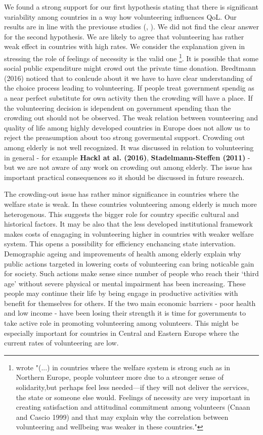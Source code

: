 \documentclass[10pt, letterpaper]{article}
\begin{document}
\begin{spacing}{1.4}
We found a strong support for our first hypothesis stating that there is significant variability among countries in a way how volunteering influences QoL.  Our results are in line with the previouse studies (\citet{haski09}, \citet{plagnol10}). We did not find the clear answer for the second hypothesis. We are likely to agree that volunteering has rather weak effect in countries with high rates. We consider the explanation given in \citet{haski09} stressing the role of feelings of necessity is the valid one \footnote{\citet{haski09} wrote "(...) in countries where the welfare system is strong such as in Northern Europe, people volunteer more due to a stronger sense of solidarity,but perhaps feel less needed—if they will not deliver the services, the state or someone else would. Feelings of necessity are very important in creating satisfaction and attitudinal commitment among volunteers (Cnaan and Cascio 1999) and that may explain why the correlation between volunteering and wellbeing was weaker in these countries."}. It is possible that some social public expenditure might crowd out the private time donation. Bredtmann (2016) noticed that to conlcude about it we have to have clear understanding of the choice process leading to volunteering. If people treat government spendig as a near perfect substitute for own activity then the crowding will have a place. If the volunteering decision is idependent on government spending than the crowding out should not be observed. The weak relation between vounteering and quality of life among highly developed countries in Europe does not allow us to reject the preasumption about too strong govermental support. Crowding out among elderly is not well recognized. It was discussed in relation to volunteering in general - for example \textbf{Hackl at al. (2016)}, \textbf{Stadelmann-Steffen (2011)} -  but we are not aware of any work on crowding out among elderly. The issue has important practical consequences so it should be discussed in future research.     

The crowding-out issue has rather minor significance in countries where the welfare state is weak. In these countries  volunteering among elderly is much more heterogenous. This suggests the bigger role for country specific cultural and historical factors. It may be also that the less developed  institutional framework makes costs of enagaging in volunteering higher in countries with weaker welfare system. This opens a possibility for efficiency enchancing state intervation. Demographic ageing and improvements of  health among elderly explain why public actions targeted in lowering costs of volunteering can bring noticable gain for society. Such actions make sense since number of people who reach their ‘third age’ without severe physical or mental impairment has been increasing. These people may continue their life by being engage in productive activities with benefit for themselves for others. If the two main economic barriers -  poor health and low income - have been losing their strength it is time for governments to take active role in promoting volunteering among volunteers. This might be especially important for countries in Central and Eastern Europe where the current rates of volunteering are low. 


\end{spacing}
\end{document}
